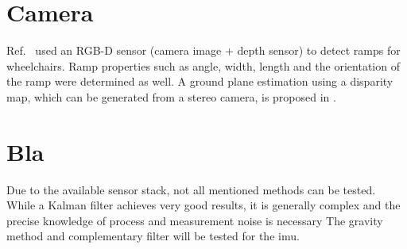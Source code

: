 


\section{Camera}
Ref.~\cite{Nejati2016} used an RGB-D sensor (camera image + depth sensor) to detect ramps for wheelchairs.
Ramp properties such as angle, width, length and the orientation of the ramp were determined as well.
A ground plane estimation using a disparity map, which can be generated from a stereo camera, is proposed in \cite{Chumerin2008}.



\section{Bla}
Due to the available sensor stack, not all mentioned methods can be tested.
While a Kalman filter achieves very good results, it is generally complex and the precise knowledge of process and measurement noise is necessary \cite{Higgins1975}
The gravity method and complementary filter will be tested for the \gls{imu}.


